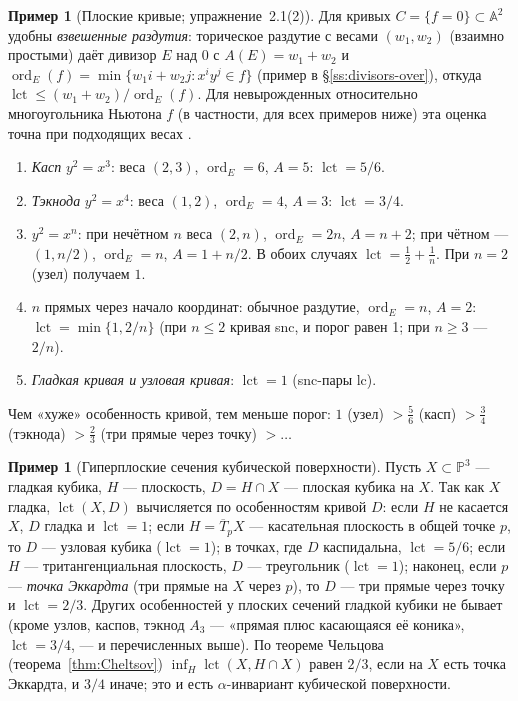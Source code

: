 \documentclass[11pt,a4paper]{article}
\theoremstyle{plain}
\theoremstyle{definition}
\newtheorem{example}[theorem]{Пример}
\theoremstyle{remark}
\newcommand{\PP}{\mathbb{P}}
\newcommand{\A}{\mathbb{A}}
\DeclareMathOperator{\ord}{ord}
\DeclareMathOperator{\lct}{lct}
\begin{document}
\begin{example}[Плоские кривые; упражнение~2.1(2)]\label{ex:lct-curves}
Для кривых $C=\{f=0\}\subset\A^2$ удобны \emph{взвешенные раздутия}: торическое раздутие с весами
$(w_1,w_2)$ (взаимно простыми) даёт дивизор $E$ над $0$ с $A(E)=w_1+w_2$ и
$\ord_E(f)=\min\{w_1i+w_2j: x^iy^j\in f\}$ (пример в \S\ref{ss:divisors-over}), откуда
$\lct\le(w_1+w_2)/\ord_E(f)$. Для невырожденных относительно многоугольника Ньютона $f$ (в
частности, для всех примеров ниже) эта оценка точна при подходящих весах \cite[\S\,8.3]{KolSing}.
\begin{enumerate}
\item \emph{Касп} $y^2=x^3$: веса $(2,3)$, $\ord_E=6$, $A=5$: $\lct=5/6$.
\item \emph{Тэкнода} $y^2=x^4$: веса $(1,2)$, $\ord_E=4$, $A=3$: $\lct=3/4$.
\item $y^2=x^n$: при нечётном $n$ веса $(2,n)$, $\ord_E=2n$, $A=n+2$; при чётном --- $(1,n/2)$,
$\ord_E=n$, $A=1+n/2$. В обоих случаях $\lct=\frac12+\frac1n$. При $n=2$ (узел) получаем $1$.
\item $n$ прямых через начало координат: обычное раздутие, $\ord_E=n$, $A=2$: $\lct=\min\{1,2/n\}$
(при $n\le2$ кривая snc, и порог равен 1; при $n\ge3$ --- $2/n$).
\item \emph{Гладкая кривая и узловая кривая}: $\lct=1$ (snc-пары lc).
\end{enumerate}
Чем «хуже» особенность кривой, тем меньше порог: $1$ (узел) $>\frac56$ (касп) $>\frac34$ (тэкнода)
$>\frac23$ (три прямые через точку) $>\dots$
\end{example}

\begin{example}[Гиперплоские сечения кубической поверхности]\label{ex:lct-cubic-sections}
Пусть $X\subset\PP^3$ --- гладкая кубика, $H$ --- плоскость, $D=H\cap X$ --- плоская кубика на
$X$. Так как $X$ гладка, $\lct(X,D)$ вычисляется по особенностям кривой $D$: если $H$ не касается
$X$, $D$ гладка и $\lct=1$; если $H=\overline T_pX$ --- касательная плоскость в общей точке $p$, то
$D$ --- узловая кубика ($\lct=1$); в точках, где $D$ каспидальна, $\lct=5/6$; если $H$ ---
тритангенциальная плоскость, $D$ --- треугольник ($\lct=1$); наконец, если $p$ --- \emph{точка
Эккардта} (три прямые на $X$ через $p$), то $D$ --- три прямые через точку и $\lct=2/3$. Других особенностей у плоских сечений гладкой кубики не бывает (кроме узлов,
каспов, тэкнод $A_3$ --- «прямая плюс касающаяся её коника», $\lct=3/4$, --- и перечисленных выше). По
теореме Чельцова (теорема~\ref{thm:Cheltsov}) $\inf_H\lct(X,H\cap X)$ равен $2/3$, если на $X$ есть
точка Эккардта, и $3/4$ иначе; это и есть $\alpha$-инвариант кубической поверхности.
\end{example}
\end{document}
